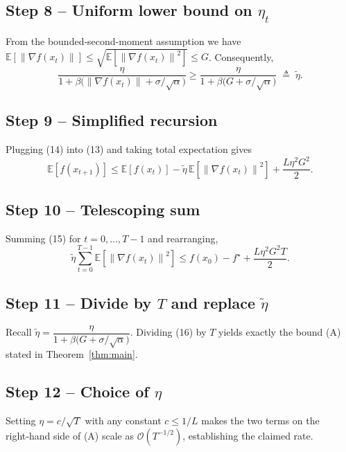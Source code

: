 \documentclass{article}
\newcommand{\EE}{\mathbb{E}}
\newcommand{\norm}[1]{\left\|#1\right\|}
\begin{document}
\subsection*{Step 8 – Uniform lower bound on $\eta_t$}
From the bounded‑second‑moment assumption we have
$\EE\!\left[\norm{\nabla f(x_t)}\right]\le\sqrt{\EE\!\left[\norm{\nabla f(x_t)}^{2}\right]}\le G$.
Consequently,
\[
\frac{\eta}{1+\beta\bigl(\norm{\nabla f(x_t)}+\sigma/\sqrt{\alpha}\bigr)}
\ge
\frac{\eta}{1+\beta\bigl(G+\sigma/\sqrt{\alpha}\bigr)}
\;\triangleq\;\tilde\eta .
\tag{14}
\]

\subsection*{Step 9 – Simplified recursion}
Plugging (14) into (13) and taking total expectation gives
\[
\EE\!\left[f(x_{t+1})\right]
\le
\EE\!\left[f(x_t)\right]
-\tilde\eta\,\EE\!\left[\norm{\nabla f(x_t)}^{2}\right]
+\frac{L\eta^{2}G^{2}}{2}.
\tag{15}
\]

\subsection*{Step 10 – Telescoping sum}
Summing (15) for $t=0,\dots,T-1$ and rearranging,
\[
\tilde\eta\sum_{t=0}^{T-1}\EE\!\left[\norm{\nabla f(x_t)}^{2}\right]
\le
f(x_0)-f^\star
+\frac{L\eta^{2}G^{2}T}{2}.
\tag{16}
\]

\subsection*{Step 11 – Divide by $T$ and replace $\tilde\eta$}
Recall $\tilde\eta=\dfrac{\eta}{1+\beta\bigl(G+\sigma/\sqrt{\alpha}\bigr)}$.
Dividing (16) by $T$ yields exactly the bound (A) stated in Theorem~\ref{thm:main}.

\subsection*{Step 12 – Choice of $\eta$}
Setting $\eta = c/\sqrt{T}$ with any constant $c\le 1/L$ makes the two terms on the right‑hand side of (A) scale as $\mathcal{O}(T^{-1/2})$, establishing the claimed rate.
\end{document}
